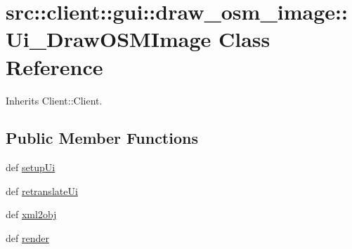 \hypertarget{classsrc_1_1client_1_1gui_1_1draw__osm__image_1_1Ui__DrawOSMImage}{
\section{src::client::gui::draw\_\-osm\_\-image::Ui\_\-DrawOSMImage Class Reference}
\label{classsrc_1_1client_1_1gui_1_1draw__osm__image_1_1Ui__DrawOSMImage}
}


Inherits Client::Client.

\subsection*{Public Member Functions}
\begin{DoxyCompactItemize}
\item 
def \hyperlink{classsrc_1_1client_1_1gui_1_1draw__osm__image_1_1Ui__DrawOSMImage_ab73c4403cb6b42e3a9c16de501f18e7d}{setupUi}
\item 
def \hyperlink{classsrc_1_1client_1_1gui_1_1draw__osm__image_1_1Ui__DrawOSMImage_a356b205b95ed1acc319b4c65ad75ad12}{retranslateUi}
\item 
def \hyperlink{classsrc_1_1client_1_1gui_1_1draw__osm__image_1_1Ui__DrawOSMImage_a64487b1d4648b4267c32a6a019213c03}{xml2obj}
\item 
def \hyperlink{classsrc_1_1client_1_1gui_1_1draw__osm__image_1_1Ui__DrawOSMImage_aa655d6c8e314c6540f905ad83ea0c071}{render}
\end{DoxyCompactItemize}
